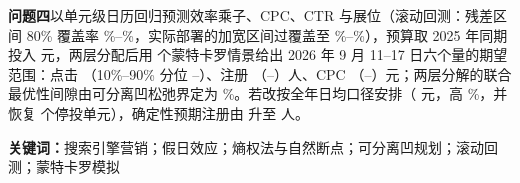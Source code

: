 \textbf{问题四}以单元级日历回归预测效率乘子、CPC、CTR 与展位（滚动回测：残差区间 80\% 覆盖率 \valBacktestCalendarCoverageMin\%--\valBacktestCalendarCoverageMax\%，实际部署的加宽区间过覆盖至 \valBacktestWideCoverageMin\%--\valBacktestWideCoverageMax\%），预算取 2025 年同期投入 \valQfourBudget{} 元，两层分配后用 \valQfourScenarios{} 个蒙特卡罗情景给出 2026 年 9 月 11--17 日六个量的期望范围：点击 \valQfourClicksMean{}（10\%--90\% 分位 \valQfourClicksLow--\valQfourClicksHigh）、注册 \valQfourRegsMean{}（\valQfourRegsLow--\valQfourRegsHigh）人、CPC \valQfourCpcMean{}（\valQfourCpcLow--\valQfourCpcHigh）元；两层分解的联合最优性间隙由可分离凹松弛界定为 \valQfourJointGapPct\%。若改按全年日均口径安排（\valQfourBudgetAnnualAlt{} 元，高 \valQfourBudgetAltOverMainPct\%，并恢复 \valQfourSkippedUnits{} 个停投单元），确定性预期注册由 \valQfourRegsExpectedSamePeriod{} 升至 \valQfourRegsExpectedAnnualAlt{} 人。

\par\vspace{0.5em}
\noindent\textbf{关键词：}搜索引擎营销；假日效应；熵权法与自然断点；可分离凹规划；滚动回测；蒙特卡罗模拟
